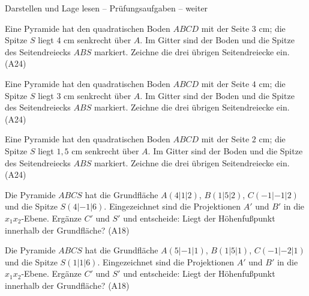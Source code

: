 \begin{aufgabe}{Darstellen und Lage lesen – Prüfungsaufgaben – weiter}
\begin{teile}
\teil Eine Pyramide hat den quadratischen Boden $ABCD$ mit der Seite $3$ cm; die Spitze $S$ liegt $4$ cm senkrecht über $A$. Im Gitter sind der Boden und die Spitze des Seitendreiecks $ABS$ markiert. Zeichne die drei übrigen Seitendreiecke ein. \hfill (A24)

\begin{ksys}[xmin=-5,xmax=9,ymin=-5,ymax=9]      \end{ksys}
\teil Eine Pyramide hat den quadratischen Boden $ABCD$ mit der Seite $4$ cm; die Spitze $S$ liegt $3$ cm senkrecht über $A$. Im Gitter sind der Boden und die Spitze des Seitendreiecks $ABS$ markiert. Zeichne die drei übrigen Seitendreiecke ein. \hfill (A24)

\begin{ksys}[xmin=-4,xmax=10,ymin=-4,ymax=10]      \end{ksys}
\teil Eine Pyramide hat den quadratischen Boden $ABCD$ mit der Seite $2$ cm; die Spitze $S$ liegt $1{,}5$ cm senkrecht über $A$. Im Gitter sind der Boden und die Spitze des Seitendreiecks $ABS$ markiert. Zeichne die drei übrigen Seitendreiecke ein. \hfill (A24)

\begin{ksys}[xmin=-2.5,xmax=5.5,ymin=-2.5,ymax=5.5]      \end{ksys}
\teil Die Pyramide $ABCS$ hat die Grundfläche $A(4 | 1 | 2)$, $B(1 | 5 | 2)$, $C(-1 | -1 | 2)$ und die Spitze $S(4 | -1 | 6)$. Eingezeichnet sind die Projektionen $A'$ und $B'$ in die $x_1x_2$-Ebene. Ergänze $C'$ und $S'$ und entscheide: Liegt der Höhenfußpunkt innerhalb der Grundfläche? \hfill (A18)

\begin{ksys3}   \end{ksys3}
\teil Die Pyramide $ABCS$ hat die Grundfläche $A(5 | -1 | 1)$, $B(1 | 5 | 1)$, $C(-1 | -2 | 1)$ und die Spitze $S(1 | 1 | 6)$. Eingezeichnet sind die Projektionen $A'$ und $B'$ in die $x_1x_2$-Ebene. Ergänze $C'$ und $S'$ und entscheide: Liegt der Höhenfußpunkt innerhalb der Grundfläche? \hfill (A18)

\begin{ksys3}   \end{ksys3}
\end{teile}
\end{aufgabe}

